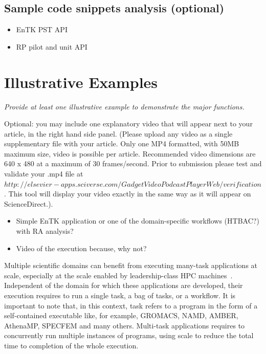 \documentclass[preprint,12pt, a4paper]{elsarticle}
\begin{document}
\subsection{Sample code snippets analysis (optional)}\label{ssec:code}

\begin{itemize}
  \item EnTK PST API
  \item RP pilot and unit API
\end{itemize}

\section{Illustrative Examples}\label{sec:examples}

{\em Provide at least one illustrative example to demonstrate the major
functions.

Optional: you may include one explanatory video that will appear next to your
article, in the right hand side panel. (Please upload any video as a single
supplementary file with your article. Only one MP4 formatted, with 50MB
maximum size, video is possible per article. Recommended video dimensions are
640 x 480 at a maximum of 30 frames/second. Prior to submission please test
and validate your .mp4 file at $
http://elsevier-apps.sciverse.com/GadgetVideoPodcastPlayerWeb/verification$.
This tool will display your video exactly in the same way as it will appear
on ScienceDirect.).}

\begin{itemize}
  \item Simple EnTK application or one of the domain-specific workflows
  (HTBAC?) with RA analysis?
  \item Video of the execution because, why not?
\end{itemize}


Multiple scientific domains can benefit from executing many-task applications
at scale, especially at the scale enabled by leadership-class HPC
machines~\cite{raicu2008many,iosup2011performance}. Independent of the domain for which these
applications are developed, their execution requires to run a single task, a
bag of tasks, or a workflow. It is important to note that, in this context,
task refers to a program in the form of a self-contained executable like, for
example, GROMACS, NAMD, AMBER, AthenaMP, SPECFEM and many others. Multi-task
applications requires to concurrently run multiple instances of programs,
using scale to reduce the total time to completion of the whole execution.
\end{document}

